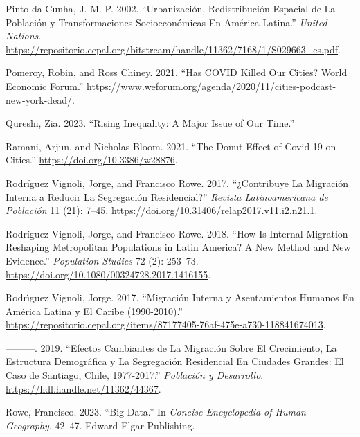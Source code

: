 \documentclass[
  11pt,
]{article}
\newlength{\cslhangindent}
\newlength{\cslentryspacingunit} %
\newenvironment{CSLReferences}[2] %
 {%
  \setlength{\parindent}{0pt}
  \ifodd #1
  \let\oldpar\par
  \def\par{\hangindent=\cslhangindent\oldpar}
  \fi
  \setlength{\parskip}{#2\cslentryspacingunit}
 }%
 {}
\begin{document}
\begin{CSLReferences}{1}{0}
\leavevmode{}%
Pinto da Cunha, J. M. P. 2002. {``Urbanización, Redistribución Espacial
de La Población y Transformaciones Socioeconómicas En América Latina.''}
\emph{United Nations}.
\url{https://repositorio.cepal.org/bitstream/handle/11362/7168/1/S029663_es.pdf}.

\leavevmode{}%
Pomeroy, Robin, and Ross Chiney. 2021. {``Has COVID Killed Our Cities?
World Economic Forum.''}
\url{https://www.weforum.org/agenda/2020/11/cities-podcast-new-york-dead/}.

\leavevmode{}%
Qureshi, Zia. 2023. {``Rising Inequality: A Major Issue of Our Time.''}

\leavevmode{}%
Ramani, Arjun, and Nicholas Bloom. 2021. {``The Donut Effect of Covid-19
on Cities.''} \url{https://doi.org/10.3386/w28876}.

\leavevmode{}%
Rodríguez Vignoli, Jorge, and Francisco Rowe. 2017. {``¿Contribuye La
Migración Interna a Reducir La Segregación Residencial?''} \emph{Revista
Latinoamericana de Población} 11 (21): 7--45.
\url{https://doi.org/10.31406/relap2017.v11.i2.n21.1}.

\leavevmode{}%
Rodríguez-Vignoli, Jorge, and Francisco Rowe. 2018. {``How Is Internal
Migration Reshaping Metropolitan Populations in Latin America? A New
Method and New Evidence.''} \emph{Population Studies} 72 (2): 253--73.
\url{https://doi.org/10.1080/00324728.2017.1416155}.

\leavevmode{}%
Rodrı́guez Vignoli, Jorge. 2017. {``Migraci{ó}n Interna y Asentamientos
Humanos En Am{é}rica Latina y El Caribe (1990-2010).''}
\url{https://repositorio.cepal.org/items/87177405-76af-475e-a730-118841674013}.

\leavevmode{}%
---------. 2019. {``Efectos Cambiantes de La Migraci{ó}n Sobre El
Crecimiento, La Estructura Demogr{á}fica y La Segregaci{ó}n Residencial
En Ciudades Grandes: El Caso de Santiago, Chile, 1977-2017.''}
\emph{Poblaci{ó}n y Desarrollo}.
\url{https://hdl.handle.net/11362/44367}.

\leavevmode{}%
Rowe, Francisco. 2023. {``Big Data.''} In \emph{Concise Encyclopedia of
Human Geography}, 42--47. Edward Elgar Publishing.


\end{CSLReferences}
\end{document}
